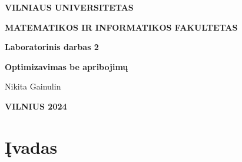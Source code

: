 \documentclass{article}
\begin{document}
\newlength{\mywidth}
\settowidth{\mywidth}{Darbo vadovas:}
\begin{titlepage}
    \vskip 20pt
    \centerline{\bf \large VILNIAUS UNIVERSITETAS}
    \bigskip
    \centerline{\large \textbf{MATEMATIKOS IR INFORMATIKOS FAKULTETAS}}
    \vskip 120pt
    \centerline{\bf \Large \textbf{Laboratorinis darbas 2}}
    \vskip 50pt
    \begin{center}
        {\bf \LARGE Optimizavimas be apribojimų}
    \end{center}
    \bigskip
    \bigskip
    \centerline{\Large Nikita Gainulin}
    \vskip 90pt
    \vskip 200pt
    \centerline{\large \textbf{VILNIUS 2024}}
\end{titlepage}

\tableofcontents

\clearpage
\section{Įvadas}
\end{document}
